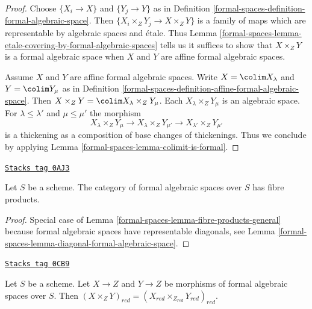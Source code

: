 \begin{proof}
Choose $\{X_i \to X\}$ and $\{Y_j \to Y\}$ as in
Definition \ref{formal-spaces-definition-formal-algebraic-space}.
Then $\{X_i \times_Z Y_j \to X \times_Z Y\}$ is a family
of maps which are representable by algebraic spaces and \'etale.
Thus Lemma \ref{formal-spaces-lemma-etale-covering-by-formal-algebraic-spaces}
tells us it suffices to show that $X \times_Z Y$ is a formal
algebraic space when $X$ and $Y$ are affine formal algebraic spaces.

\medskip\noindent
Assume $X$ and $Y$ are affine formal algebraic spaces.
Write $X = \colim X_\lambda$ and $Y = \colim Y_\mu$ as
in Definition \ref{formal-spaces-definition-affine-formal-algebraic-space}.
Then $X \times_Z Y = \colim X_\lambda \times_Z Y_\mu$.
Each $X_\lambda \times_Z Y_\mu$ is an algebraic space.
For $\lambda \leq \lambda'$ and $\mu \leq \mu'$ the morphism
$$
X_\lambda \times_Z Y_\mu \to
X_\lambda \times_Z Y_{\mu'} \to
X_{\lambda'} \times_Z Y_{\mu'}
$$
is a thickening as a composition of base changes of thickenings.
Thus we conclude by applying Lemma \ref{formal-spaces-lemma-colimit-is-formal}.
\end{proof}

\begin{lemma}
\label{formal-spaces-lemma-fibre-products}
\href{https://stacks.math.columbia.edu/tag/0AJ3}{\texttt{Stacks tag 0AJ3}}

Let $S$ be a scheme. The category of formal algebraic spaces over $S$
has fibre products.
\end{lemma}

\begin{proof}
Special case of Lemma \ref{formal-spaces-lemma-fibre-products-general}
because formal algebraic spaces have representable diagonals, see
Lemma \ref{formal-spaces-lemma-diagonal-formal-algebraic-space}.
\end{proof}

\begin{lemma}
\label{formal-spaces-lemma-reduction-fibre-products}
\href{https://stacks.math.columbia.edu/tag/0CB9}{\texttt{Stacks tag 0CB9}}

Let $S$ be a scheme. Let $X \to Z$ and $Y \to Z$ be morphisms of
formal algebraic spaces over $S$. Then
$(X \times_Z Y)_{red} = (X_{red} \times_{Z_{red}} Y_{red})_{red}$.
\end{lemma}

